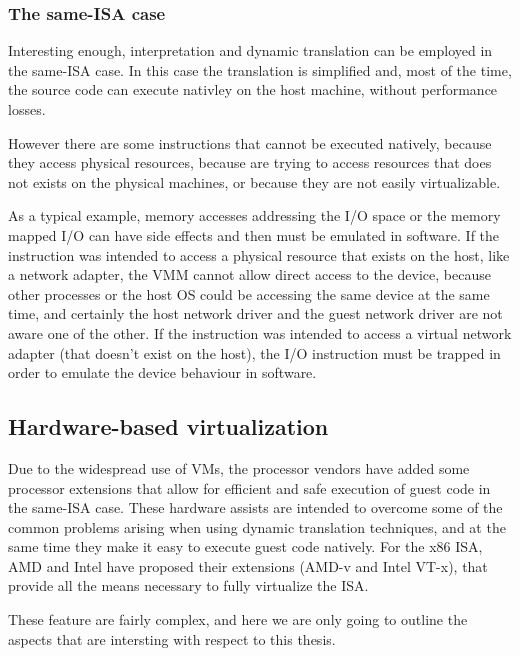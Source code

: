\subsubsection{The same-ISA case}
\label{sec:sidt}
Interesting enough, interpretation and dynamic translation can be employed in the same-ISA case. In this case the translation is
simplified and, most of the time, the source code can execute nativley on the host machine, without performance losses.

However there are some instructions that cannot be executed natively, because they access physical resources, because
are trying to access resources that does not exists on the physical machines, or because they are not easily virtualizable. %

As a typical example, memory accesses addressing the I/O space or the memory mapped I/O can have side effects and then must be emulated 
in software. If the instruction was intended to access a physical resource that exists on the host, like a network adapter, the VMM 
cannot allow direct access to the device, because other processes or the host OS could be accessing the same device at the same time,
and certainly the host network driver and the guest network driver are not aware one of the other.
If the instruction was intended to access a virtual network adapter (that doesn't exist on the host), the I/O instruction must be trapped
in order to emulate the device behaviour in software.


\subsection{Hardware-based virtualization}
\label{sec:hbv}
Due to the widespread use of VMs, the processor vendors have added some processor extensions that allow for efficient and safe execution
of guest code in the same-ISA case. These hardware assists are intended to overcome some of the common problems arising when using
dynamic translation techniques, and at the same time they make it easy to execute guest code natively.
For the x86 ISA, AMD and Intel have proposed their extensions (AMD-v and Intel VT-x), that provide all the means necessary to fully
virtualize the ISA.

These feature are fairly complex, and here we are only going to outline the aspects that are intersting with respect to this thesis.

